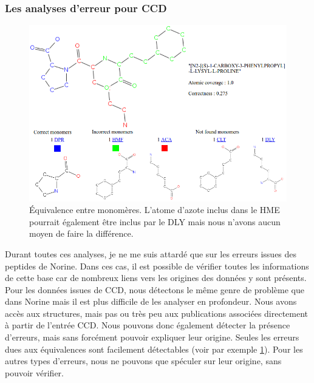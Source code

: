 \subsubsection{Les analyses d'erreur pour CCD}

\begin{figure}[h!]
  \begin{center}
    \includegraphics[width=450px]{Figures/s2m/results/CCD_results.png}
    \caption{\label{CCD_results}Équivalence entre monomères.
    L'atome d'azote inclus dans le HME pourrait également être inclus par le DLY mais nous n'avons aucun moyen de faire la différence.}
  \end{center}
\end{figure}

Durant toutes ces analyses, je ne me suis attardé que sur les erreurs issues des peptides de Norine.
Dans ces cas, il est possible de vérifier toutes les informations de cette base car de nombreux liens vers les origines des données y sont présents.
Pour les données issues de CCD, nous détectons le même genre de problème que dans Norine mais il est plus difficile de les analyser en profondeur.
Nous avons accès aux structures, mais pas ou très peu aux publications associées directement à partir de l'entrée CCD.
Nous pouvons donc également détecter la présence d'erreurs, mais sans forcément pouvoir expliquer leur origine.
Seules les erreurs dues aux équivalences sont facilement détectables (voir par exemple \ref{CCD_results}).
Pour les autres types d'erreurs, nous ne pouvons que spéculer sur leur origine, sans pouvoir vérifier.
